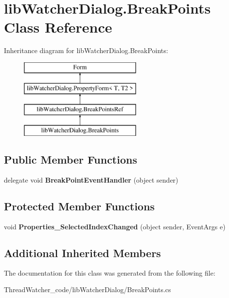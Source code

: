 \hypertarget{classlib_watcher_dialog_1_1_break_points}{\section{lib\+Watcher\+Dialog.\+Break\+Points Class Reference}
\label{classlib_watcher_dialog_1_1_break_points}
}
Inheritance diagram for lib\+Watcher\+Dialog.\+Break\+Points\+:\begin{figure}[H]
\begin{center}
\leavevmode
\includegraphics[height=4.000000cm]{classlib_watcher_dialog_1_1_break_points}
\end{center}
\end{figure}
\subsection*{Public Member Functions}
\begin{DoxyCompactItemize}
\item 
\hypertarget{classlib_watcher_dialog_1_1_break_points_a858006399a828fa3629ca8bbb45fcf17}{delegate void {\bfseries Break\+Point\+Event\+Handler} (object sender)}\label{classlib_watcher_dialog_1_1_break_points_a858006399a828fa3629ca8bbb45fcf17}

\end{DoxyCompactItemize}
\subsection*{Protected Member Functions}
\begin{DoxyCompactItemize}
\item 
\hypertarget{classlib_watcher_dialog_1_1_break_points_acfbd42c77bb810a341d2bd216f644068}{void {\bfseries Properties\+\_\+\+Selected\+Index\+Changed} (object sender, Event\+Args e)}\label{classlib_watcher_dialog_1_1_break_points_acfbd42c77bb810a341d2bd216f644068}

\end{DoxyCompactItemize}
\subsection*{Additional Inherited Members}


The documentation for this class was generated from the following file\+:\begin{DoxyCompactItemize}
\item 
Thread\+Watcher\+\_\+code/lib\+Watcher\+Dialog/Break\+Points.\+cs\end{DoxyCompactItemize}
